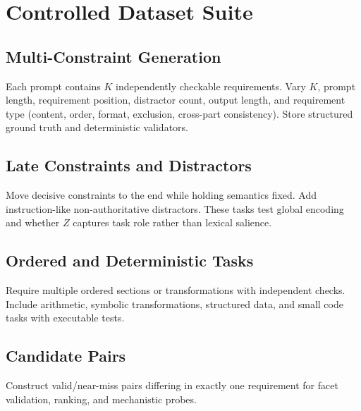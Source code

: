 \documentclass[11pt]{article}
\begin{document}
\section{Controlled Dataset Suite}
\subsection{Multi-Constraint Generation}
Each prompt contains $K$ independently checkable requirements. Vary $K$, prompt length, requirement position, distractor count, output length, and requirement type (content, order, format, exclusion, cross-part consistency). Store structured ground truth and deterministic validators.

\subsection{Late Constraints and Distractors}
Move decisive constraints to the end while holding semantics fixed. Add instruction-like non-authoritative distractors. These tasks test global encoding and whether $Z$ captures task role rather than lexical salience.

\subsection{Ordered and Deterministic Tasks}
Require multiple ordered sections or transformations with independent checks. Include arithmetic, symbolic transformations, structured data, and small code tasks with executable tests.

\subsection{Candidate Pairs}
Construct valid/near-miss pairs differing in exactly one requirement for facet validation, ranking, and mechanistic probes.
\end{document}
